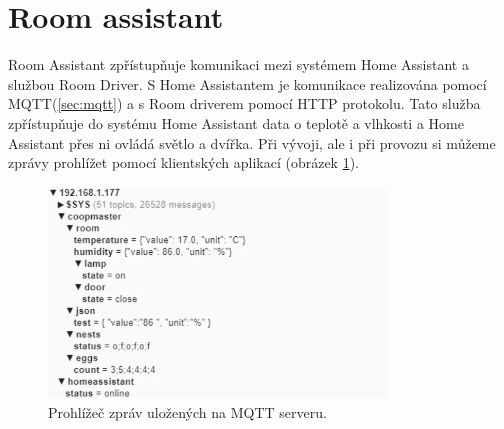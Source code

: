 \section{Room assistant}\label{sec:room-assistant}

Room Assistant zpřístupňuje komunikaci mezi systémem Home Assistant a službou Room Driver.\newline
S Home Assistantem je komunikace realizována pomocí MQTT(\ref{sec:mqtt}) a s Room driverem pomocí HTTP protokolu.
Tato služba zpřístupňuje do systému Home Assistant data o teplotě a vlhkosti a Home Assistant přes ni ovládá světlo a dvířka.
Při vývoji, ale i při provozu si můžeme zprávy prohlížet pomocí klientských aplikací (obrázek \ref{fig:homeassistant_input_data_mqtt}).

\begin{figure}[h]
    \centering
    \includegraphics[width=0.8\textwidth]{img/homeassistant_input_data_mqtt}
    \caption{Prohlížeč zpráv uložených na MQTT serveru.}
    \label{fig:homeassistant_input_data_mqtt}
\end{figure}


